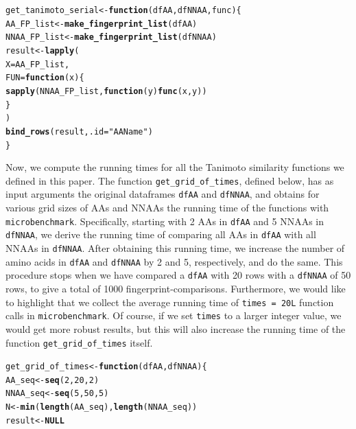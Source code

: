 \documentclass[a4paper,11pt]{article}\usepackage[]{graphicx}\usepackage[]{xcolor}
\makeatletter
\newcommand{\hlnum}[1]{\textcolor[rgb]{0.686,0.059,0.569}{#1}}%
\newcommand{\hlsng}[1]{\textcolor[rgb]{0.192,0.494,0.8}{#1}}%
\newcommand{\hldef}[1]{\textcolor[rgb]{0.345,0.345,0.345}{#1}}%
\newcommand{\hlkwa}[1]{\textcolor[rgb]{0.161,0.373,0.58}{\textbf{#1}}}%
\newcommand{\hlkwb}[1]{\textcolor[rgb]{0.69,0.353,0.396}{#1}}%
\newcommand{\hlkwc}[1]{\textcolor[rgb]{0.333,0.667,0.333}{#1}}%
\newcommand{\hlkwd}[1]{\textcolor[rgb]{0.737,0.353,0.396}{\textbf{#1}}}%
\newenvironment{kframe}{%
 \def\at@end@of@kframe{}%
 \ifinner\ifhmode%
  \def\at@end@of@kframe{\end{minipage}}%
  \begin{minipage}{\columnwidth}%
 \fi\fi%
 \def\FrameCommand##1{\hskip\@totalleftmargin \hskip-\fboxsep
 \colorbox{shadecolor}{##1}\hskip-\fboxsep
     \hskip-\linewidth \hskip-\@totalleftmargin \hskip\columnwidth}%
 \MakeFramed {\advance\hsize-\width
   \@totalleftmargin\z@ \linewidth\hsize
   \@setminipage}}%
 {\par\unskip\endMakeFramed%
 \at@end@of@kframe}
\newenvironment{knitrout}{}{} %
\newcommand{\code}[1]{\texttt{#1}}
\makeatother
\begin{document}
\begin{enumerate}
\begin{knitrout}
\color{fgcolor}\begin{kframe}
\begin{alltt}
\hldef{get_tanimoto_serial} \hlkwb{<-} \hlkwa{function}\hldef{(}\hlkwc{dfAA}\hldef{,} \hlkwc{dfNNAA}\hldef{,} \hlkwc{func}\hldef{) \{}
  \hldef{AA_FP_list} \hlkwb{<-} \hlkwd{make_fingerprint_list}\hldef{(dfAA)}
  \hldef{NNAA_FP_list} \hlkwb{<-} \hlkwd{make_fingerprint_list}\hldef{(dfNNAA)}
  \hldef{result} \hlkwb{<-} \hlkwd{lapply}\hldef{(}
    \hlkwc{X} \hldef{= AA_FP_list,}
    \hlkwc{FUN} \hldef{=} \hlkwa{function}\hldef{(}\hlkwc{x}\hldef{) \{}
      \hlkwd{sapply}\hldef{(NNAA_FP_list,} \hlkwa{function}\hldef{(}\hlkwc{y}\hldef{)} \hlkwd{func}\hldef{(x, y))}
    \hldef{\}}
  \hldef{)}
  \hlkwd{bind_rows}\hldef{(result,} \hlkwc{.id} \hldef{=} \hlsng{"AAName"}\hldef{)}
\hldef{\}}
\end{alltt}
\end{kframe}
\end{knitrout}

Now, we compute the running times for all the Tanimoto similarity functions we defined in this paper. The function \code{get\_grid\_of\_times}, defined below, has as input arguments the original dataframes \code{dfAA} and \code{dfNNAA}, and obtains for various grid sizes of AAs and NNAAs the running time of the functions with \code{microbenchmark}. Specifically, starting with 2 AAs in \code{dfAA} and 5 NNAAs in \code{dfNNAA}, we derive the running time of comparing all AAs in \code{dfAA} with all NNAAs in \code{dfNNAA}. After obtaining this running time, we increase the number of amino acids in \code{dfAA} and \code{dfNNAA} by 2 and 5, respectively, and do the same. This procedure stops when we have compared a \code{dfAA} with 20 rows with a \code{dfNNAA} of 50 rows, to give a total of 1000 fingerprint-comparisons. Furthermore, we would like to highlight that we collect the average running time of \code{times = 20L} function calls in \code{microbenchmark}. Of course, if we set \code{times} to a larger integer value, we would get more robust results, but this will also increase the running time of the function \code{get\_grid\_of\_times} itself. 

\begin{knitrout}
\color{fgcolor}\begin{kframe}
\begin{alltt}
\hldef{get_grid_of_times} \hlkwb{<-} \hlkwa{function}\hldef{(}\hlkwc{dfAA}\hldef{,} \hlkwc{dfNNAA}\hldef{) \{}
  \hldef{AA_seq} \hlkwb{<-} \hlkwd{seq}\hldef{(}\hlnum{2}\hldef{,} \hlnum{20}\hldef{,} \hlnum{2}\hldef{)}
  \hldef{NNAA_seq} \hlkwb{<-} \hlkwd{seq}\hldef{(}\hlnum{5}\hldef{,} \hlnum{50}\hldef{,} \hlnum{5}\hldef{)}
  \hldef{N} \hlkwb{<-} \hlkwd{min}\hldef{(}\hlkwd{length}\hldef{(AA_seq),} \hlkwd{length}\hldef{(NNAA_seq))}
  \hldef{result} \hlkwb{<-} \hlkwa{NULL}


\end{alltt}
\end{kframe}
\end{knitrout}
\end{enumerate}
\end{document}
